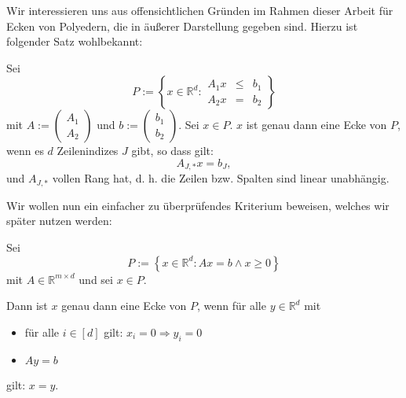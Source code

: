 \documentclass[10p,a4paper,BCOR = 12mm, DIV=15]{scrbook}
\begin{document}
{Wir interessieren uns aus offensichtlichen Gründen im Rahmen dieser Arbeit für Ecken von Polyedern, die in äußerer Darstellung gegeben sind. Hierzu ist folgender Satz wohlbekannt:
\begin{Sa}
\label{sa:ecke_polyeder}
Sei
\begin{displaymath}
P := \left\{x \in \mathbb{R}^d:
\begin{array}{ccc}
A_1 x & \leq & b_1 \\
A_2 x & = & b_2
\end{array}
\right\}
\end{displaymath}
mit $A := \left(
\begin{array}{cc}
A_1 \\
A_2
\end{array}
\right)$
und $b := \left(
\begin{array}{cc}
b_1 \\
b_2
\end{array}
\right)$. Sei $x\in P$. $x$ ist genau dann eine Ecke von $P$, wenn es $d$ Zeilenindizes $J$ gibt, so dass gilt:
\begin{displaymath}
A_{J, *} x = b_J,
\end{displaymath}
und $A_{J, *}$ vollen Rang hat, d. h. die Zeilen bzw. Spalten sind linear unabhängig.
\end{Sa}

Wir wollen nun ein einfacher zu überprüfendes Kriterium beweisen, welches wir später nutzen werden:

\begin{Le}
\label{sa:ecken_verwendet}
Sei
\begin{displaymath}
P := \left\{x \in \mathbb{R}^d: 
A x = b \wedge x \geq 0
\right\}
\end{displaymath}
mit $A \in \mathbb{R}^{m \times d}$ und sei $x\in P$.

Dann ist $x$ genau dann eine Ecke von $P$, wenn für alle $y \in \mathbb{R}^d$ mit
\begin{itemize}
\item für alle $i \in \left[d\right]$ gilt: $x_i = 0 \Rightarrow y_i = 0$
\item $A y = b$
\end{itemize}
gilt: $x=y$.


\end{Le}}
\end{document}

